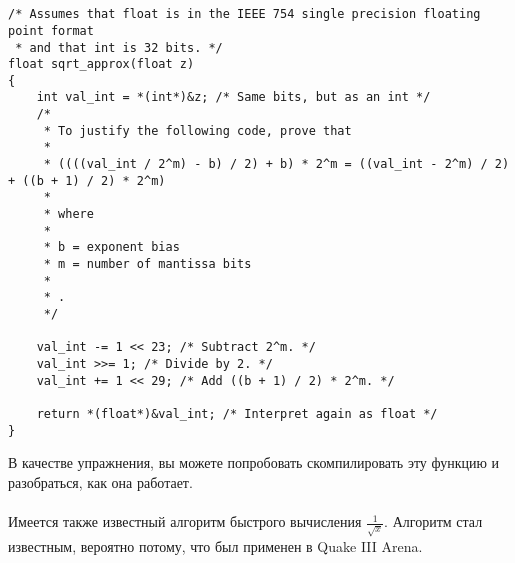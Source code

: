 \section{}




\EN{}

\subsection{}

%

\begin{lstlisting}[caption=\EN{The source code is taken from Wikipedia}\RU{Исходный код взят из Wikipedia}: \url{http://go.yurichev.com/17364}]
/* Assumes that float is in the IEEE 754 single precision floating point format
 * and that int is 32 bits. */
float sqrt_approx(float z)
{
    int val_int = *(int*)&z; /* Same bits, but as an int */
    /*
     * To justify the following code, prove that
     *
     * ((((val_int / 2^m) - b) / 2) + b) * 2^m = ((val_int - 2^m) / 2) + ((b + 1) / 2) * 2^m)
     *
     * where
     *
     * b = exponent bias
     * m = number of mantissa bits
     *
     * .
     */
 
    val_int -= 1 << 23; /* Subtract 2^m. */
    val_int >>= 1; /* Divide by 2. */
    val_int += 1 << 29; /* Add ((b + 1) / 2) * 2^m. */
 
    return *(float*)&val_int; /* Interpret again as float */
}
\end{lstlisting}

\ifdefined\RUSSIAN
В качестве упражнения, вы можете попробовать скомпилировать эту функцию и разобраться, как она работает. \\
\\
Имеется также известный алгоритм быстрого вычисления $\frac{1}{\sqrt{x}}$.
Алгоритм стал известным, вероятно потому, что был применен в Quake III Arena.


